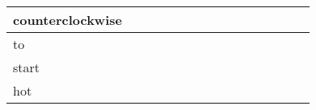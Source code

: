 \documentclass[landscape]{article}
\newcommand{\ssp}{\hspace{2pt}}
\begin{document}
\begin{tabular}{|l|p{10pt}|p{10pt}|p{10pt}|p{10pt}|p{10pt}|p{10pt}|p{10pt}|p{10pt}|p{10pt}|p{10pt}|p{10pt}|p{10pt}|p{10pt}|p{10pt}|}
\ssp counterclockwise \ssp&\hspace{2pt}&\hspace{2pt}&\hspace{2pt}&\hspace{2pt}&\hspace{2pt}&\hspace{2pt}&\hspace{2pt}&\hspace{2pt}&\hspace{2pt}&\hspace{2pt}&\hspace{2pt}&\hspace{2pt}&\hspace{2pt}&\hspace{2pt}\\
\hline
\ssp to \ssp&\hspace{2pt}&\hspace{2pt}&\hspace{2pt}&\hspace{2pt}&\hspace{2pt}&\hspace{2pt}&\hspace{2pt}&\hspace{2pt}&\hspace{2pt}&\hspace{2pt}&\hspace{2pt}&\hspace{2pt}&\hspace{2pt}&\hspace{2pt}\\
\hline
\ssp start \ssp&\hspace{2pt}&\hspace{2pt}&\hspace{2pt}&\hspace{2pt}&\hspace{2pt}&\hspace{2pt}&\hspace{2pt}&\hspace{2pt}&\hspace{2pt}&\hspace{2pt}&\hspace{2pt}&\hspace{2pt}&\hspace{2pt}&\hspace{2pt}\\
\hline
\ssp hot \ssp&\hspace{2pt}&\hspace{2pt}&\hspace{2pt}&\hspace{2pt}&\hspace{2pt}&\hspace{2pt}&\hspace{2pt}&\hspace{2pt}&\hspace{2pt}&\hspace{2pt}&\hspace{2pt}&\hspace{2pt}&\hspace{2pt}&\hspace{2pt}\\

\end{tabular}
\end{document}
